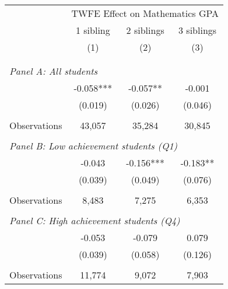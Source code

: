 \makeatletter
{}
{
\makeatother
\begin{tabular}{lccc}
\toprule
\cmidrule(lr){2-4}
& \multicolumn{3}{c}{TWFE Effect on Mathematics GPA} \\
\cmidrule(lr){2-4}
& 1 sibling & 2 siblings & 3 siblings  \\
\cmidrule(lr){2-2} \cmidrule(lr){3-3} \cmidrule(lr){4-4}
& (1) & (2) & (3)\\
\bottomrule
&  &  &  \\
&  &  &   \\
\multicolumn{4}{l}{\textit{Panel A: All students}} \\
\hspace{3mm}        &      -0.058***&      -0.057** &      -0.001   \\
                    &     (0.019)   &     (0.026)   &     (0.046)   \\
                    &               &               &               \\
\hspace{3mm}Observations&      43,057   &      35,284   &      30,845   \\
 
&  &  &   \\
\multicolumn{4}{l}{\textit{Panel B: Low achievement students (Q1)}} \\
\hspace{3mm}        &      -0.043   &      -0.156***&      -0.183** \\
                    &     (0.039)   &     (0.049)   &     (0.076)   \\
                    &               &               &               \\
\hspace{3mm}Observations&       8,483   &       7,275   &       6,353   \\
 
&  &  &   \\
\multicolumn{4}{l}{\textit{Panel C: High achievement students (Q4)}} \\
\hspace{3mm}        &      -0.053   &      -0.079   &       0.079   \\
                    &     (0.039)   &     (0.058)   &     (0.126)   \\
                    &               &               &               \\
\hspace{3mm}Observations&      11,774   &       9,072   &       7,903   \\
 

\end{tabular}}
